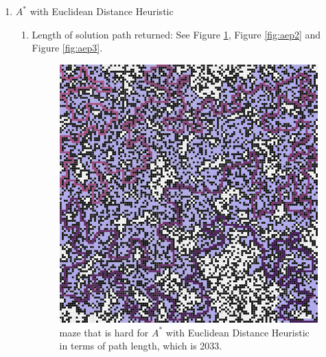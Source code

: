 \documentclass[letter]{article}
\begin{document}
\begin{enumerate}[resume]
\begin{enumerate}
			\item {$ A^* $ with Euclidean Distance Heuristic}
			\label{A*E} 
			\begin{enumerate}
				\item {Length of solution path returned: See Figure \ref{fig:aep1}, Figure \ref{fig:aep2} and Figure \ref{fig:aep3}.} \\
				\begin{figure}
					\minipage{\textwidth}
					
					\includegraphics[width=\textwidth]{../pics/aep/2033.png}
					\caption{\label{fig:aep1}maze that is hard for $ A^* $ with Euclidean Distance Heuristic in terms of path length, which is 2033.}
					

\end{figure}
\end{enumerate}
\end{enumerate}
\end{enumerate}
\end{document}
